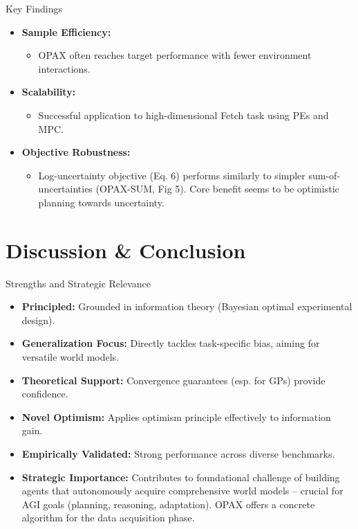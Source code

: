 \documentclass[11pt,aspectratio=169,handout]{beamer} %
\begin{document}
\begin{frame}{Key Findings}
    \begin{itemize}
        \item \textbf{Sample Efficiency:}
        \begin{itemize}
            \item OPAX often reaches target performance with fewer environment interactions.
        \end{itemize}
        \pause
        \item \textbf{Scalability:}
        \begin{itemize}
            \item Successful application to high-dimensional Fetch task using PEs and MPC.
        \end{itemize}
        \pause
        \item \textbf{Objective Robustness:}
        \begin{itemize}
            \item Log-uncertainty objective (Eq. 6) performs similarly to simpler sum-of-uncertainties (OPAX-SUM, Fig 5). Core benefit seems to be optimistic planning towards uncertainty.
        \end{itemize}
    \end{itemize}
\end{frame}

\section{Discussion \& Conclusion}

\begin{frame}{Strengths and Strategic Relevance}
    \begin{itemize}
        \item \textbf{Principled:} Grounded in information theory (Bayesian optimal experimental design).
        \item \textbf{Generalization Focus:} Directly tackles task-specific bias, aiming for versatile world models.
        \item \textbf{Theoretical Support:} Convergence guarantees (esp. for GPs) provide confidence.
        \item \textbf{Novel Optimism:} Applies optimism principle effectively to information gain.
        \item \textbf{Empirically Validated:} Strong performance across diverse benchmarks.
        \pause
        \item \textbf{Strategic Importance:} Contributes to foundational challenge of building agents that autonomously acquire comprehensive world models – crucial for AGI goals (planning, reasoning, adaptation). OPAX offers a concrete algorithm for the data acquisition phase.
    \end{itemize}
\end{frame}
\end{document}
